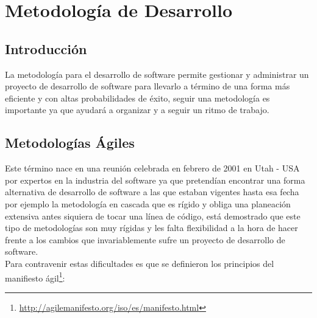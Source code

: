 
 \chapter{Metodología de Desarrollo}
 \label{cha:metodologia_de_desarrollo}

\section{Introducción}

   La metodología para el desarrollo de software permite gestionar y administrar un proyecto de desarrollo de software para llevarlo a término de una forma más eficiente y con altas probabilidades de éxito, seguir una metodología es importante ya que ayudará a organizar y a seguir un ritmo de trabajo.



   \section{Metodologías Ágiles}
   \label{sec:metodologias_agiles}

   Este término nace en una reunión celebrada en febrero de 2001 en Utah - USA por expertos en la industria del software ya que pretendían encontrar una forma alternativa de desarrollo de software a las que estaban vigentes hasta esa fecha por ejemplo la metodología en cascada que es rígido y obliga una planeación extensiva antes siquiera de tocar una línea de código, está demostrado que este tipo de metodologías son muy rígidas y les falta flexibilidad a la hora de hacer frente a los cambios que invariablemente sufre un proyecto de desarrollo de software.\\



   Para contravenir estas dificultades es que se definieron los principios del manifiesto ágil\footnote{\url{http://agilemanifesto.org/iso/es/manifesto.html}}:

